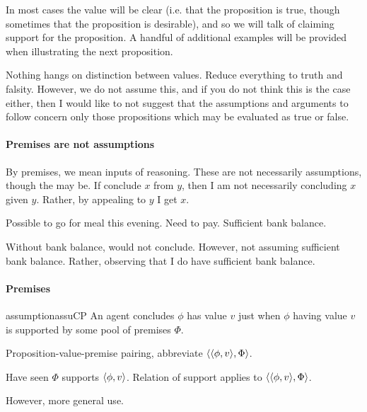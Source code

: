 \begin{note}
In most cases the value will be clear (i.e. that the proposition is true, though sometimes that the proposition is desirable), and so we will talk of claiming support for the proposition.
  A handful of additional examples will be provided when illustrating the next proposition.
\end{note}

\begin{note}
  Nothing hangs on distinction between values.
  Reduce everything to truth and falsity.
  However, we do not assume this, and if you do not think this is the case either, then I would like to not suggest that the assumptions and arguments to follow concern only those propositions which may be evaluated as true or false.
\end{note}

\paragraph*{Premises are not assumptions}

\begin{note}
  By premises, we mean inputs of reasoning.
  These are not necessarily assumptions, though the may be.
  If conclude \(x\) from \(y\), then I am not necessarily concluding \(x\) given \(y\).
  Rather, by appealing to \(y\) I get \(x\).

  Possible to go for meal this evening.
  Need to pay.
  Sufficient bank balance.

  Without bank balance, would not conclude.
  However, not assuming sufficient bank balance.
  Rather, observing that I do have sufficient bank balance.
\end{note}

\paragraph*{Premises}

\begin{note}
  \begin{restatable}{assumption}{assuCP}
    \label{assu:C-E-premises}
    An agent concludes \(\phi\) has value \(v\) just when \(\phi\) having value \(v\) is supported by some pool of premises \(\Phi\).
  \end{restatable}
\end{note}

\begin{note}[Notation]
  \begin{notation}
    Proposition-value-premise pairing, abbreviate \(\langle \langle \phi, v \rangle, \Phi \rangle\).
  \end{notation}
  Have seen \(\Phi\) supports \(\langle \phi, v \rangle\).
  Relation of support applies to \(\langle \langle \phi, v \rangle, \Phi \rangle\).

  However, more general use.
\end{note}

